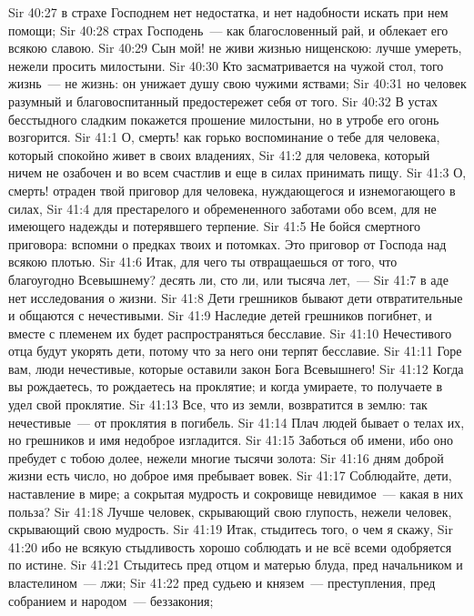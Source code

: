 \vs Sir 40:27 в страхе Господнем нет недостатка, и нет надобности искать при нем помощи;
\vs Sir 40:28 страх Господень~--- как благословенный рай, и облекает его всякою славою.
\rsbpar\vs Sir 40:29 Сын мой! не живи жизнью нищенскою: лучше умереть, нежели просить милостыни.
\vs Sir 40:30 Кто засматривается на чужой стол, того жизнь~--- не жизнь: он унижает душу свою чужими яствами;
\vs Sir 40:31 но человек разумный и благовоспитанный предостережет себя от того.
\vs Sir 40:32 В устах бесстыдного сладким покажется прошение милостыни, но в утробе его огонь возгорится.
\vs Sir 41:1 О, смерть! как горько воспоминание о тебе для человека, который спокойно живет в своих владениях,
\vs Sir 41:2 для человека, который ничем не озабочен и во всем счастлив и еще в силах принимать пищу.
\vs Sir 41:3 О, смерть! отраден твой приговор для человека, нуждающегося и изнемогающего в силах,
\vs Sir 41:4 для престарелого и обремененного заботами обо всем, для не имеющего надежды и потерявшего терпение.
\vs Sir 41:5 Не бойся смертного приговора: вспомни о предках твоих и потомках. Это приговор от Господа над всякою плотью.
\vs Sir 41:6 Итак, для чего ты отвращаешься от того, что благоугодно Всевышнему? десять ли, сто ли, или тысяча лет,~---
\vs Sir 41:7 в аде нет исследования о  жизни.
\vs Sir 41:8 Дети грешников бывают дети отвратительные и общаются с нечестивыми.
\vs Sir 41:9 Наследие детей грешников погибнет, и вместе с племенем их будет распространяться бесславие.
\vs Sir 41:10 Нечестивого отца будут укорять дети, потому что за него они терпят бесславие.
\vs Sir 41:11 Горе вам, люди нечестивые, которые оставили закон Бога Всевышнего!
\vs Sir 41:12 Когда вы рождаетесь, то рождаетесь на проклятие; и когда умираете, то получаете в удел свой проклятие.
\vs Sir 41:13 Все, что из земли, возвратится в землю: так нечестивые~--- от проклятия в погибель.
\vs Sir 41:14 Плач людей бывает о телах их, но грешников и имя недоброе изгладится.
\vs Sir 41:15 Заботься об имени, ибо оно пребудет с тобою долее, нежели многие тысячи золота:
\vs Sir 41:16 дням доброй жизни есть число, но доброе имя пребывает вовек.
\rsbpar\vs Sir 41:17 Соблюдайте, дети, наставление в мире; а сокрытая мудрость и сокровище невидимое~--- какая в них польза?
\vs Sir 41:18 Лучше человек, скрывающий свою глупость, нежели человек, скрывающий свою мудрость.
\vs Sir 41:19 Итак, стыдитесь того, о чем я скажу,
\vs Sir 41:20 ибо не всякую стыдливость хорошо соблюдать и не всё всеми одобряется по истине.
\vs Sir 41:21 Стыдитесь пред отцом и матерью блуда, пред начальником и властелином~--- лжи;
\vs Sir 41:22 пред судьею и князем~--- преступления, пред собранием и народом~--- беззакония;
